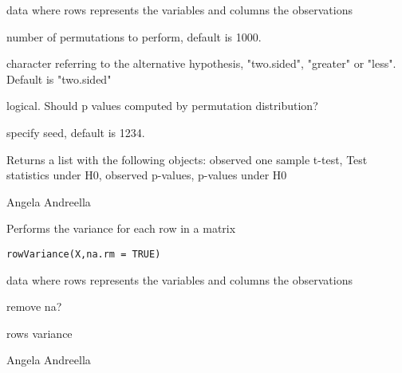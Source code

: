 \documentclass[a4paper]{book}
\begin{document}
\begin{Arguments}
\begin{ldescription}
\item[\code{X}] data where rows represents the variables and columns the observations

\item[\code{B}] number of permutations to perform, default is 1000.

\item[\code{alternative}] character referring to the alternative hypothesis, "two.sided", "greater" or "less". Default is "two.sided"

\item[\code{rand}] logical. Should p values computed by permutation distribution?

\item[\code{seed}] specify seed, default is 1234.
\end{ldescription}
\end{Arguments}
%
\begin{Value}
Returns a list with the following objects:  observed one sample t-test,  Test statistics under H0,  observed p-values,  p-values under H0
\end{Value}
%
\begin{Author}\relax
Angela Andreella
\end{Author}
%
\begin{Description}\relax
Performs the variance for each row in a matrix
\end{Description}
%
\begin{Usage}
\begin{verbatim}
rowVariance(X,na.rm = TRUE)
\end{verbatim}
\end{Usage}
%
\begin{Arguments}
\begin{ldescription}
\item[\code{X}] data where rows represents the variables and columns the observations

\item[\code{na.rm}] remove na?
\end{ldescription}
\end{Arguments}
%
\begin{Value}
rows variance
\end{Value}
%
\begin{Author}\relax
Angela Andreella
\end{Author}
\printindex{}
\end{document}
